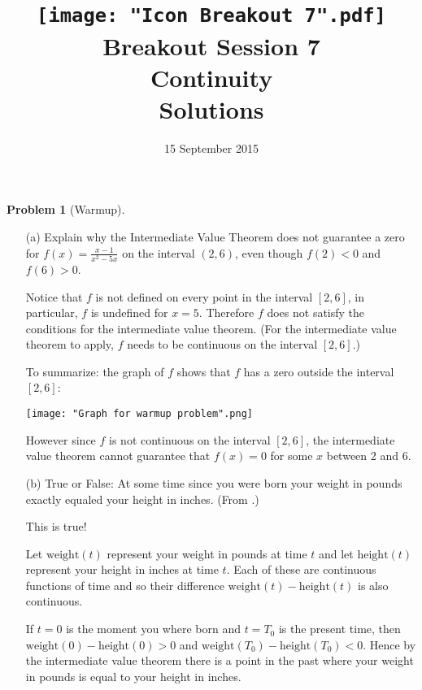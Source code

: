 \documentclass{article}
\title{\texttt{[image: "Icon Breakout 7".pdf]}\\
  Breakout Session 7\\
  Continuity\\
  Solutions
}
\date{15 September 2015}
\theoremstyle{definition}
\newtheorem{Problem}{Problem}
\begin{document}
\maketitle
\begin{Problem}[Warmup]
  \mbox{}
  \begin{itemize}
    \item[(a)]
      Explain why the Intermediate Value Theorem does not guarantee a zero for $f(x) = \frac{x-1}{x^2 - 5x}$ on the interval $(2,6)$, even though $f(2) < 0$ and $f(6) > 0$.
      \begin{Solution}
        Notice that $f$ is not defined on every point in the interval $[2, 6]$, in particular, $f$ is undefined for $x = 5$.
        Therefore $f$ does not satisfy the conditions for the intermediate value theorem.
        (For the intermediate value theorem to apply, $f$ needs to be continuous on the interval $[2,6]$.)

        To summarize: the graph of $f$ shows that $f$ has a zero outside the interval $[2, 6]$:
        \begin{center}
          \texttt{[image: "Graph for warmup problem".png]}
        \end{center}
        However since $f$ is not continuous on the interval $[2, 6]$, the intermediate value theorem cannot guarantee that $f(x) = 0$ for some $x$ between 2 and 6.
      \end{Solution}

    \item[(b)]
      True or False: At some time since you were born your weight in pounds exactly equaled your height in inches.
      (From \cite[Question 7]{terrell_goodquestions_2005}.)
      \begin{Solution}
        This is true!

        Let $\mathrm{weight}(t)$ represent your weight in pounds at time $t$ and let $\mathrm{height}(t)$ represent your height in inches at time $t$.
        Each of these are continuous functions of time and so their difference $\mathrm{weight}(t) - \mathrm{height}(t)$ is also continuous.

        If $t = 0$ is the moment you where born and $t = T_0$ is the present time, then $\mathrm{weight}(0) - \mathrm{height}(0) > 0$ and $\mathrm{weight}(T_0) - \mathrm{height}(T_0) < 0$.
        Hence by the intermediate value theorem there is a point in the past where your weight in pounds is equal to your height in inches.
      \end{Solution}
  \end{itemize}
\end{Problem}
\end{document}
